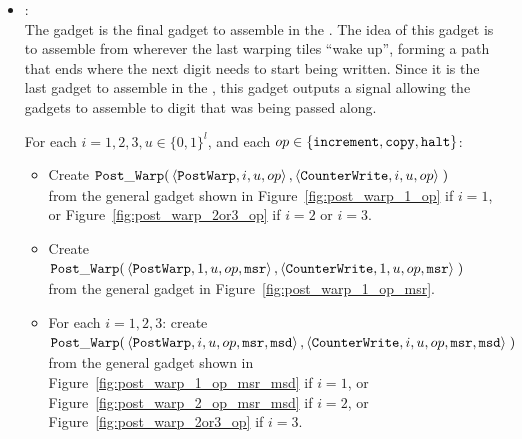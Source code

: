 \begin{itemize}
    \item {\postwarp}: \\
    The {\postwarp} gadget is the final gadget to assemble in the {\warpunit}.
    The idea of this gadget is to assemble from wherever the last warping tiles ``wake up'', forming a path that ends where the next digit needs to start being written.
    Since it is the last gadget to assemble in the {\warpunit}, this gadget outputs a signal allowing the {\cwrite} gadgets to assemble to digit that was being passed along.

    For each $i = 1,2,3, u \in \{0, 1\}^l$, and each $op \in \{ {\tt increment}, {\tt copy}, {\tt halt} \}$:
    \begin{itemize}
       \item Create
        $\begin{aligned}[t]
            \postwarp(& \left \langle {\tt PostWarp},     i, u, \inc \right\rangle,    %
                        \left \langle {\tt CounterWrite}, i, u, \inc \right\rangle \;) %
        \end{aligned}$ \\
        from the general gadget shown in Figure~\ref{fig:post_warp_1_op} if $i = 1$,
        or Figure~\ref{fig:post_warp_2or3_op} if $ i = 2$ or $i = 3$.
        \vspace{.5cm}


        \item Create
        $\begin{aligned}[t]
            \postwarp(& \left \langle {\tt PostWarp},     1, u, \inc, {\tt msr} \right\rangle,    %
                        \left \langle {\tt CounterWrite}, 1, u, \inc, {\tt msr} \right\rangle \;) %
        \end{aligned}$ \\
        from the general gadget in Figure~\ref{fig:post_warp_1_op_msr}.
        \vspace{.5cm}

        \item For each $i=1,2,3$: create\\
        $\begin{aligned}[t]
            \postwarp(& \left \langle {\tt PostWarp},     i, u, \inc, {\tt msr}, {\tt msd} \right\rangle,    %
                        \left \langle {\tt CounterWrite}, i, u, \inc, {\tt msr}, {\tt msd} \right\rangle \;) %
        \end{aligned}$ \\
        from the general gadget shown in Figure~\ref{fig:post_warp_1_op_msr_msd} if $i = 1$, or
        Figure~\ref{fig:post_warp_2_op_msr_msd} if $i = 2$, or Figure~\ref{fig:post_warp_2or3_op} if $i = 3$.
        \vspace{.5cm}
    \end{itemize}


\end{itemize}
